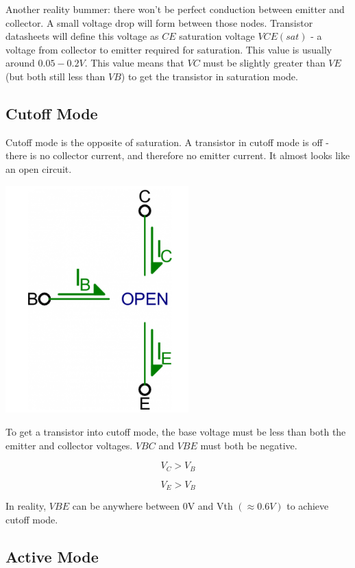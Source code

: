 \documentclass[a4paper, 11pt]{article} %
\begin{document}
Another reality bummer: there won't be perfect conduction between emitter and collector. A small voltage drop will form between those nodes. Transistor datasheets will define this voltage as $CE$ saturation voltage $VCE(sat)$ - a voltage from collector to emitter required for saturation. This value is usually around $0.05-0.2V$. This value means that $VC$ must be slightly greater than $VE$ (but both still less than $VB$) to get the transistor in saturation mode.

\subsection*{Cutoff Mode}

Cutoff mode is the opposite of saturation. A transistor in cutoff mode is off - there is no collector current, and therefore no emitter current. It almost looks like an open circuit.

\begin{center}
\includegraphics[width=200pt]{tran12}
\end{center}

To get a transistor into cutoff mode, the base voltage must be less than both the emitter and collector voltages. $VBC$ and $VBE$ must both be negative.

$$V_{C} > V_{B}$$

$$V_{E} > V_{B}$$

In reality, $VBE$ can be anywhere between 0V and Vth $(\approx 0.6V)$ to achieve cutoff mode.

\subsection*{Active Mode}
\end{document}
